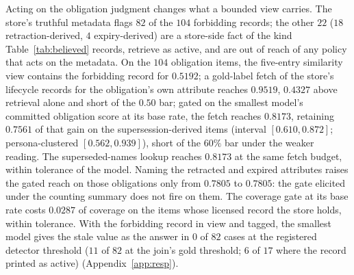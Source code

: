 Acting on the obligation judgment changes what a bounded view carries. The store's truthful metadata flags $82$ of the $104$ forbidding records; the other $22$ ($18$ retraction-derived, $4$ expiry-derived) are a store-side fact of the kind Table~\ref{tab:believed} records, retrieve as active, and are out of reach of any policy that acts on the metadata. On the $104$ obligation items, the five-entry similarity view contains the forbidding record for $0.5192$; a gold-label fetch of the store's lifecycle records for the obligation's own attribute reaches $0.9519$, $0.4327$ above retrieval alone and short of the $0.50$ bar; gated on the smallest model's committed obligation score at its base rate, the fetch reaches $0.8173$, retaining $0.7561$ of that gain on the supersession-derived items (interval $[0.610, 0.872]$; persona-clustered $[0.562, 0.939]$), short of the $60\%$ bar under the weaker reading. The superseded-names lookup reaches $0.8173$ at the same fetch budget, within tolerance of the model. Naming the retracted and expired attributes raises the gated reach on those obligations only from $0.7805$ to $0.7805$: the gate elicited under the counting summary does not fire on them. The coverage gate at its base rate costs $0.0287$ of coverage on the items whose licensed record the store holds, within tolerance. With the forbidding record in view and tagged, the smallest model gives the stale value as the answer in $0$ of $82$ cases at the registered detector threshold ($11$ of $82$ at the join's gold threshold; $6$ of $17$ where the record printed as active) (Appendix~\ref{app:resp}).

